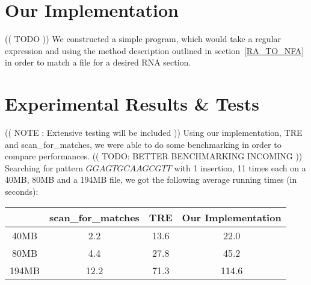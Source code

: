 \section{Our Implementation}
(( TODO ))
We constructed  a simple program, which would take a regular expression and using the method description outlined in section~\ref{RA_TO_NFA} in order to match a file for a desired RNA section.

\section{Experimental Results \& Tests} %
(( NOTE : Extensive testing will be included ))
Using our implementation, TRE and scan\_for\_matches, we were able to do some benchmarking in order to compare performances.
(( TODO: BETTER BENCHMARKING INCOMING ))
Searching for pattern $GGAGTGCAAGCGTT$ with 1 insertion, 11 times each on a 40MB, 80MB and a 194MB file, we got the following average running times (in seconds):\\
\begin{tabular}{ c | c | c |  c }
 &scan\_for\_matches & TRE & Our Implementation \\
 \hline
 40MB & 2.2 & 13.6 & 22.0 \\
 80MB & 4.4 & 27.8 & 45.2 \\
 194MB & 12.2 &  71.3 &  114.6
\end{tabular}

